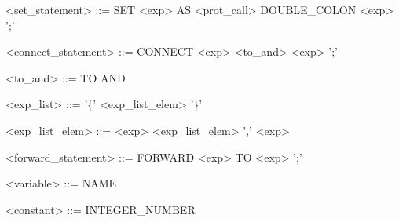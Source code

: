 \begin{grammar}
<set\_statement> ::= SET <exp> AS <prot\_call> DOUBLE\_COLON <exp> ';'

<connect\_statement> ::= CONNECT <exp> <to\_and> <exp> ';'

<to\_and> ::= TO \alt AND

<exp\_list> ::= '\{' <exp\_list\_elem> '\}'

<exp\_list\_elem> ::= <exp> \alt <exp\_list\_elem> ',' <exp>

<forward\_statement> ::= FORWARD <exp> TO <exp> ';'

<variable> ::= NAME

<constant> ::= INTEGER\_NUMBER

\end{grammar}
